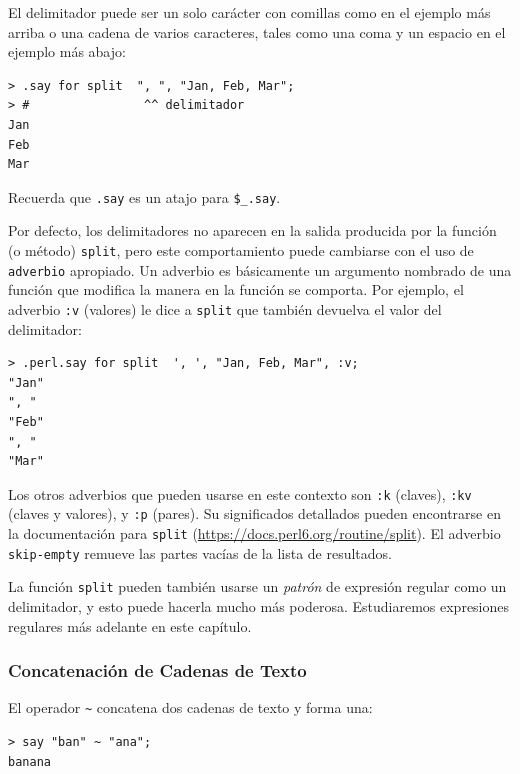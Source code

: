El delimitador puede ser un solo carácter con comillas como
en el ejemplo más arriba o una cadena de varios caracteres, 
tales como una coma y un espacio en el ejemplo más abajo:

\begin{lstlisting}
> .say for split  ", ", "Jan, Feb, Mar";
> #                ^^ delimitador
Jan
Feb
Mar
\end{lstlisting}

Recuerda que \verb|.say| es un atajo para \verb|$_.say|.

Por defecto, los delimitadores no aparecen en la salida producida por 
la función (o método) {\tt split}, pero este comportamiento puede 
cambiarse con el uso de {\tt adverbio} apropiado. Un adverbio es básicamente
un argumento nombrado de una función que modifica la manera en la 
función se comporta. Por ejemplo, el adverbio {\tt :v} (valores)
le dice a {\tt split} que también devuelva el valor del delimitador:

\begin{lstlisting}
> .perl.say for split  ', ', "Jan, Feb, Mar", :v;
"Jan"
", "
"Feb"
", "
"Mar"
\end{lstlisting}

Los otros adverbios que pueden usarse en este contexto son {\tt :k} (claves), 
{\tt :kv} (claves y valores), y {\tt :p} (pares). Su significados detallados pueden
encontrarse en la documentación para {\tt split}
(\url{https://docs.perl6.org/routine/split}). El adverbio {\tt skip-empty}
remueve las partes vacías de la lista de resultados.

La función {\tt split} pueden también usarse un \emph{patrón} 
de expresión regular como un delimitador, y esto puede hacerla
mucho más poderosa. Estudiaremos expresiones regulares más adelante
en este capítulo.

\subsubsection{Concatenación de Cadenas de Texto}


El operador \verb|~| concatena dos cadenas de texto y forma una:

\begin{lstlisting}
> say "ban" ~ "ana";
banana
\end{lstlisting}
%

